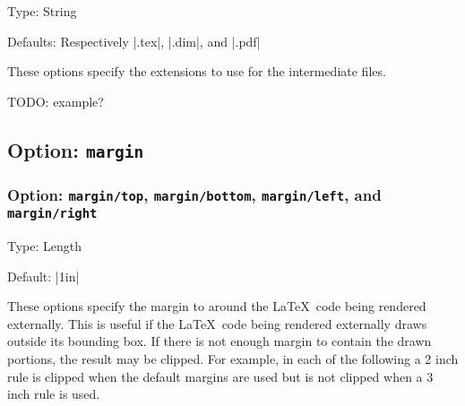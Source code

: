\documentclass[10pt]{ltxdoc}
\newcommand{\opt}[1]{\texttt{#1}}
\begin{document}
Type: String

Defaults: Respectively |.tex|, |.dim|, and |.pdf|

These options specify the extensions to use for the intermediate files.

TODO: example?

\subsection{Option: \opt{margin}}
\label{subsec:margin}

\subsubsection{Option: \opt{margin/top}, \opt{margin/bottom}, \opt{margin/left}, and \opt{margin/right}}
\label{subsubsec:margin/top, margin/bottom, margin/left, and margin/right}

Type: Length

Default: |1in|

These options specify the margin to around the \LaTeX\ code being
rendered externally.
This is useful if the \LaTeX\ code being rendered externally draws
outside its bounding box.
If there is not enough margin to contain the drawn portions, the result
may be clipped.
For example, in each of the following a 2 inch rule is clipped when the
default margins are used but is not clipped when a 3 inch rule is used.

\begin{tcblisting}{}

\end{tcblisting}

\begin{tcblisting}{}
\begin{flushright}

\end{flushright}
\end{tcblisting}

\begin{tcblisting}{}
\vspace{2in}
\end{tcblisting}

\begin{tcblisting}{}
\vspace{2in}
\end{tcblisting}
\end{document}
